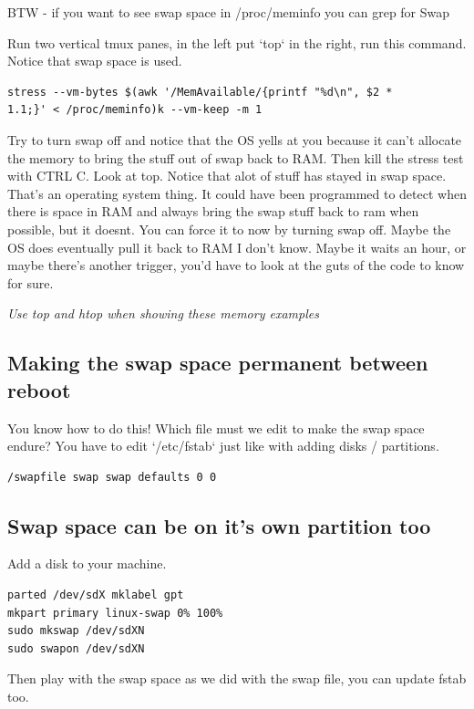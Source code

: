 \documentclass[10pt]{article}
\begin{document}
BTW - if you want to see swap space in /proc/meminfo you can grep for Swap


Run two vertical tmux panes, in the left put `top` in the right, run this
command. Notice that swap space is used.

\begin{lstlisting}
stress --vm-bytes $(awk '/MemAvailable/{printf "%d\n", $2 *
1.1;}' < /proc/meminfo)k --vm-keep -m 1 
\end{lstlisting}

Try to turn swap off and notice that the OS yells at you because it can't
allocate the memory to bring the stuff out of swap back to RAM.  Then kill the
stress test with CTRL C. Look at top. Notice that alot of stuff has stayed in
swap space. That's an operating system thing. It could have been programmed to
detect when there is space in RAM and always bring the swap stuff back to ram
when possible, but it doesnt. You can force it to now by turning swap off. Maybe
the OS does eventually pull it back to RAM I don't know. Maybe it waits an hour,
or maybe there's another trigger, you'd have to look at the guts of the code to
know for sure.

{\LARGE\textit{Use top and htop when showing these memory examples}}

\subsection{Making the swap space permanent between reboot}

You know how to do this! Which file must we edit to make the swap space endure?
You have to edit `/etc/fstab` just like with adding disks / partitions.

\begin{lstlisting}
/swapfile swap swap defaults 0 0 
\end{lstlisting}

\subsection{Swap space can be on it's own partition too}
Add a disk to your machine.

\begin{lstlisting}
parted /dev/sdX mklabel gpt
mkpart primary linux-swap 0% 100%
sudo mkswap /dev/sdXN
sudo swapon /dev/sdXN 
\end{lstlisting}

Then play with the swap space as we did with the swap file, you can update fstab
too.
\end{document}
